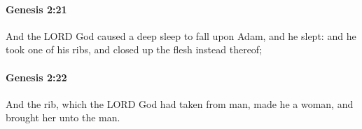 		\paragraph{Genesis 2:21} %
			\label{GENESIS-2-21}

			And the LORD God caused a deep sleep to fall upon Adam, and he slept: and he took one of his ribs, and closed up the flesh instead thereof;


		\paragraph{Genesis 2:22} %
			\label{GENESIS-2-22}

			And the rib, which the LORD God had taken from man, made he a woman, and brought her unto the man.


